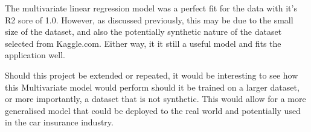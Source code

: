 \documentclass{article}
\begin{document}
The multivariate linear regression model was a perfect fit for the data with it's R2 sore of 1.0. However, as discussed previously, this may be due to the small size of the dataset, and also the potentially synthetic nature of the dataset selected from Kaggle.com. Either way, it it still a useful model and fits the application well.

Should this project be extended or repeated, it would be interesting to see how this Multivariate model would perform should it be trained on a larger dataset, or more importantly, a dataset that is not synthetic. This would allow for a more generalised model that could be deployed to the real world and potentially used in the car insurance industry.
\newpage

\printbibliography
\end{document}
